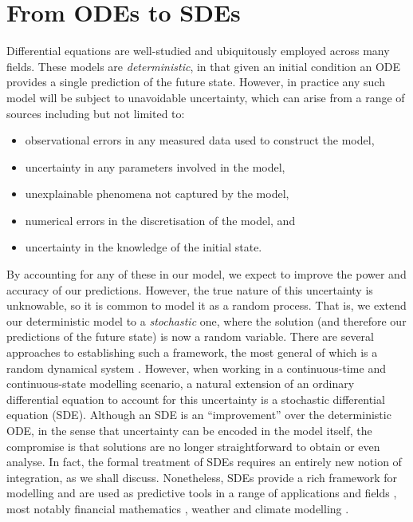 \section{From ODEs to SDEs}
Differential equations are well-studied and ubiquitously employed across many fields.
These models are \emph{deterministic}, in that given an initial condition an ODE provides a single prediction of the future state.
However, in practice any such model will be subject to unavoidable uncertainty, which can arise from a range of sources including but not limited to:
\begin{itemize}
	\item observational errors in any measured data used to construct the model,
	\item uncertainty in any parameters involved in the model,
	\item unexplainable phenomena not captured by the model,
	\item numerical errors in the discretisation of the model, and
	\item uncertainty in the knowledge of the initial state.
\end{itemize}
By accounting for any of these in our model, we expect to improve the power and accuracy of our predictions.
However, the true nature of this uncertainty is unknowable, so it is common to model it as a random process.
That is, we extend our deterministic model to a \emph{stochastic} one, where the solution (and therefore our predictions of the future state) is now a random variable.
There are several approaches to establishing such a framework, the most general of which is a random dynamical system \citep{Arnold_1998_RandomDynamicalSystems,NeckelRupp_2013_RandomDifferentialEquations}.
However, when working in a continuous-time and continuous-state modelling scenario, a natural extension of an ordinary differential equation to account for this uncertainty is a stochastic differential equation (SDE).
Although an SDE is an ``improvement'' over the deterministic ODE, in the sense that uncertainty can be encoded in the model itself, the compromise is that solutions are no longer straightforward to obtain or even analyse.
In fact, the formal treatment of SDEs requires an entirely new notion of integration, as we shall discuss.
Nonetheless, SDEs provide a rich framework for modelling and are used as predictive tools in a range of applications and fields \citep{Balasuriya_2020_StochasticApproachesLagrangian,SarkkaSolin_2019_AppliedStochasticDifferential,Oksendal_2003_StochasticDifferentialEquations,Jazwinski_2014_StochasticProcessesFiltering}, most notably financial mathematics \citehere, weather and climate modelling \citep{BernerEtAl_2017_StochasticParameterizationNew,Palmer_2019_StochasticWeatherClimate,FranzkeEtAl_2015_StochasticClimateTheory}.
